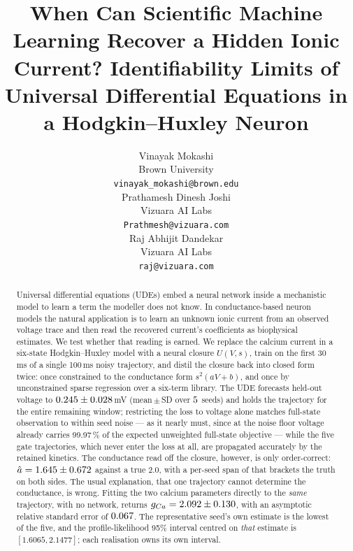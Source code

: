 \documentclass{article}
\title{When Can Scientific Machine Learning Recover a Hidden Ionic Current?
Identifiability Limits of Universal Differential Equations in a
Hodgkin--Huxley Neuron}
\author{
  Vinayak Mokashi \\
  Brown University \\
  \texttt{vinayak\_mokashi@brown.edu} \\
  \And
  Prathamesh Dinesh Joshi \\
  Vizuara AI Labs \\
  \texttt{Prathmesh@vizuara.com} \\
  \And
  Raj Abhijit Dandekar \\
  Vizuara AI Labs \\
  \texttt{raj@vizuara.com} \\
}
\newcommand{\Tfull}{100}       %
\newcommand{\Ttrain}{30}       %
\newcommand{\gcaMain}{2.0}     %
\newcommand{\LossShareV}{99.97}
\begin{document}
\maketitle

\begin{abstract}
Universal differential equations (UDEs) embed a neural network inside a
mechanistic model to learn a term the modeller does not know. In
conductance-based neuron models the natural application is to learn an unknown
ionic current from an observed voltage trace and then read the recovered
current's coefficients as biophysical estimates. We test whether that reading is
earned.
We replace the calcium current in a six-state Hodgkin--Huxley model with a
neural closure $U(V,s)$, train on the first \Ttrain\,ms of a single \Tfull\,ms
noisy trajectory, and
distil the closure back into closed form twice: once constrained to the
conductance form $s^2(aV+b)$, and once by unconstrained sparse regression over a
six-term library.
The UDE forecasts held-out voltage to $0.245 \pm 0.028$\,mV
(mean\,$\pm$\,SD over $5$ seeds) and holds the trajectory for
the entire remaining window; restricting the loss to voltage alone matches
full-state observation to within seed noise --- as it nearly must, since at the
noise floor voltage already carries \LossShareV\,\% of the expected unweighted
full-state objective --- while
the five gate trajectories, which never enter the loss at all, are propagated
accurately by the retained kinetics.
The conductance read off the closure, however, is only order-correct:
$\hat{a} = 1.645 \pm 0.672$ against a true $\gcaMain$, with a
per-seed span of \valSymbolicAHatRangeTrajTrain{} that brackets the truth on both
sides.
The usual explanation, that one trajectory cannot determine the conductance, is
wrong. Fitting the two calcium parameters directly to the \emph{same} trajectory,
with no network, returns $g_{Ca} = 2.092 \pm 0.130$, with an
asymptotic relative standard error of $0.067$. The
representative seed's own estimate is the lowest of the five, and the
profile-likelihood 95\% interval centred on \emph{that} estimate is $[1.6065, 2.1477]$; %
each realisation owns its own interval. %

\end{abstract}
\end{document}
